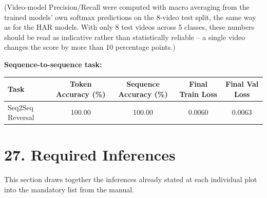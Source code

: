 \documentclass[10pt]{article}
\begin{document}
(Video-model Precision/Recall were computed with macro averaging from the
trained models' own softmax predictions on the 8-video test split, the same
way as for the HAR models. With only 8 test videos across 5 classes, these
numbers should be read as indicative rather than statistically reliable --
a single video changes the score by more than 10 percentage points.)

\textbf{Sequence-to-sequence task:}

\begin{center}
\begin{tabular}{|l|c|c|c|c|}
\hline
Task & Token Accuracy (\%) & Sequence Accuracy (\%) & Final Train Loss & Final Val Loss\\
\hline
Seq2Seq Reversal & 100.00 & 100.00 & 0.0060 & 0.0063\\
\hline
\end{tabular}
\end{center}

\section*{27. Required Inferences}

This section draws together the inferences already stated at each
individual plot into the mandatory list from the manual.
\end{document}
